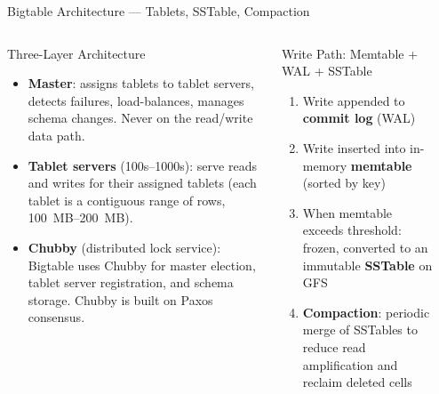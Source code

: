 \documentclass[aspectratio=169,10pt]{beamer}
\begin{document}
\begin{frame}{Bigtable Architecture — Tablets, SSTable, Compaction}
  \begin{columns}[T]
      \begin{block}{Three-Layer Architecture}
        \begin{itemize}
          \item \textbf{Master}: assigns tablets to tablet servers,
                detects failures, load-balances, manages schema changes.
                Never on the read/write data path.
          \item \textbf{Tablet servers} (100s--1000s): serve reads and
                writes for their assigned tablets (each tablet is a
                contiguous range of rows, 100~MB--200~MB).
          \item \textbf{Chubby} (distributed lock service): Bigtable
                uses Chubby for master election, tablet server
                registration, and schema storage.
                Chubby is built on Paxos consensus.
        \end{itemize}
      \end{block}
      \vspace{5pt}
      \begin{block}{Write Path: Memtable + WAL + SSTable}
        \begin{enumerate}
          \item Write appended to \textbf{commit log} (WAL)
          \item Write inserted into in-memory \textbf{memtable}
                (sorted by key)
          \item When memtable exceeds threshold: frozen, converted
                to an immutable \textbf{SSTable} on GFS
          \item \textbf{Compaction}: periodic merge of SSTables to
                reduce read amplification and reclaim deleted cells
        \end{enumerate}
      \end{block}

      \begin{center}
\end{center}
\end{columns}
\end{frame}
\end{document}
